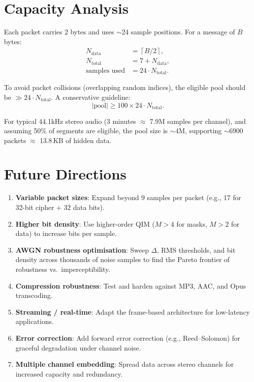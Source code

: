 \documentclass[11pt,a4paper]{article}
\newcommand{\ceil}[1]{\left\lceil #1 \right\rceil}
\begin{document}
\section{Capacity Analysis}
\label{sec:capacity}

Each packet carries 2 bytes and uses $\sim$24 sample positions.  For a
message of $B$ bytes:
\begin{align}
    N_\text{data} &= \ceil{B / 2}, \\
    N_\text{total} &= 7 + N_\text{data}, \\
    \text{samples used} &= 24 \cdot N_\text{total}.
\end{align}

To avoid packet collisions (overlapping random indices), the eligible pool
should be $\gg 24 \cdot N_\text{total}$.  A conservative guideline:
\[
    |\text{pool}| \geq 100 \times 24 \cdot N_\text{total}.
\]

For typical 44.1kHz stereo audio (3 minutes $\approx$ 7.9M samples per channel),
and assuming 50\% of segments are eligible, the pool size is $\sim$4M,
supporting $\sim$6900 packets $\approx$ 13.8\,KB of hidden data.


\section{Future Directions}
\label{sec:future}

\begin{enumerate}
    \item \textbf{Variable packet sizes}: Expand beyond 9 samples per
          packet (e.g., 17 for 32-bit cipher + 32 data bits).
    \item \textbf{Higher bit density}: Use higher-order QIM ($M > 4$
          for masks, $M > 2$ for data) to increase bits per sample.
    \item \textbf{AWGN robustness optimisation}: Sweep $\Delta$, RMS
          thresholds, and bit density across thousands of noise samples
          to find the Pareto frontier of robustness vs.\ imperceptibility.
    \item \textbf{Compression robustness}: Test and harden against MP3,
          AAC, and Opus transcoding.
    \item \textbf{Streaming / real-time}: Adapt the frame-based
          architecture for low-latency applications.
    \item \textbf{Error correction}: Add forward error correction (e.g.,
          Reed--Solomon) for graceful degradation under channel noise.
    \item \textbf{Multiple channel embedding}: Spread data across stereo
          channels for increased capacity and redundancy.
\end{enumerate}
\end{document}
